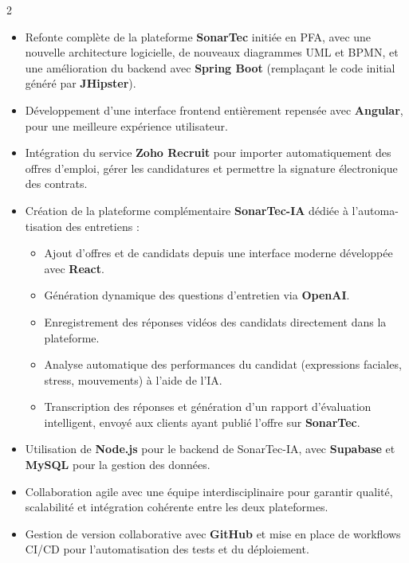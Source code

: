 \documentclass[10pt,a4paper,ragged2e,withhyper]{altacv}
\begin{document}
\begin{paracol}{2}

\begin{itemize}
  \item Refonte complète de la plateforme \textbf{SonarTec} initiée en PFA, avec une nouvelle architecture logicielle, de nouveaux diagrammes UML et BPMN, et une amélioration du backend avec \textbf{Spring Boot} (remplaçant le code initial généré par \textbf{JHipster}).
  \item Développement d'une interface frontend entièrement repensée avec \textbf{Angular}, pour une meilleure expérience utilisateur.
  \item Intégration du service \textbf{Zoho Recruit} pour importer automatiquement des offres d'emploi, gérer les candidatures et permettre la signature électronique des contrats.
  \item Création de la plateforme complémentaire \textbf{SonarTec-IA} dédiée à l'automa-tisation des entretiens :
  \begin{itemize}
    \item Ajout d'offres et de candidats depuis une interface moderne développée avec \textbf{React}.
    \item Génération dynamique des questions d'entretien via \textbf{OpenAI}.
    \item Enregistrement des réponses vidéos des candidats directement dans la plateforme.
    \item Analyse automatique des performances du candidat (expressions faciales, stress, mouvements) à l'aide de l'IA.
    \item Transcription des réponses et génération d'un rapport d'évaluation intelligent, envoyé aux clients ayant publié l'offre sur \textbf{SonarTec}.
  \end{itemize}
  \item Utilisation de \textbf{Node.js} pour le backend de SonarTec-IA, avec \textbf{Supabase} et \textbf{MySQL} pour la gestion des données.
  \item Collaboration agile avec une équipe interdisciplinaire pour garantir qualité, scalabilité et intégration cohérente entre les deux plateformes.
  \item Gestion de version collaborative avec \textbf{GitHub} et mise en place de workflows CI/CD pour l'automatisation des tests et du déploiement.
\end{itemize}
           



\end{paracol}
\end{document}
